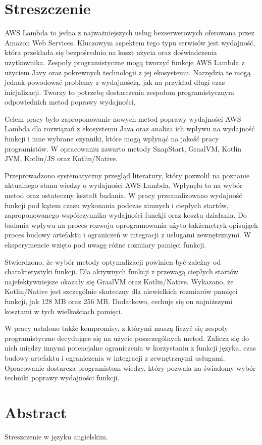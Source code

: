 \section*{Streszczenie}

AWS Lambda to jedna z najważniejszych usług bezserwerowych oferowana przez Amazon Web Services.
Kluczowym aspektem tego typu serwisów jest wydajność, która przekłada się bezpośrednio na koszt użycia oraz doświadczenia użytkownika.
Zespoły programistyczne mogą tworzyć funkcje AWS Lambda z użyciem Javy oraz pokrewnych technologii z jej ekosystemu.
Narzędzia te mogą jednak powodować problemy z wydajnością, jak na przykład długi czas inicjalizacji.
Tworzy to potrzebę dostarczenia zespołom programistycznym odpowiednich metod poprawy wydajności.

Celem pracy było zaproponowanie nowych metod poprawy wydajności AWS Lambda dla rozwiązań z ekosystemu Java oraz analiza ich wpływu na wydajność funkcji i inne wybrane czynniki, które mogą wpłynąć na jakość pracy programistów.
W opracowaniu zawarto metody SnapStart, GraalVM, Kotlin JVM, Kotlin/JS oraz Kotlin/Native.

Przeprowadzono systematyczny przegląd literatury, który pozwolił na poznanie aktualnego stanu wiedzy o wydajności AWS Lambda.
Wpłynęło to na wybór metod oraz ostateczny kształt badania.
W pracy przeanalizowano wydajność funkcji pod kątem czasu wykonania podczas zimnych i ciepłych startów, zaproponowanego współczynnika wydajności funckji oraz kosztu działania.
Do badania wpływu na proces rozwoju oprogramowania użyto takżemetryk opisująch proces budowy artefaktu i ograniczeń w integracji z usługami zewnętrznymi.
W eksperymencie wzięto pod uwagę różne rozmiary pamięci funkcji.

Stwierdzono, że wybór metody optymalizacji powinien być zależny od charakterystyki funkcji.
Dla aktywnych funkcji z przewagą ciepłych startów najefektywniejsze okazały się GraalVM oraz Kotlin/Native.
Wykazano, że Kotlin/Native jest szczególnie skuteczny dla niewielkich rozmiarów pamięci funkcji, jak 128 MB oraz 256 MB.
Dodatkowo, cechuje się on najniższymi kosztami w tych wielkościach pamięci.

W pracy ustalono także kompromisy, z którymi muszą liczyć się zespoły programistyczne decydujące się na użycie poszczególnych metod.
Zalicza się do nich między innymi potencjalne ograniczenia w korzystaniu z funkcji języka, czas budowy artefaktu i ograniczenia w integracji z zewnętrznymi usługami.
Opracowanie dostarcza programistom wiedzy, który pozwala na świadomy wybór techniki poprawy wydajności funkcji.

\section*{Abstract}

Streszczenie  w języku angielskim.
